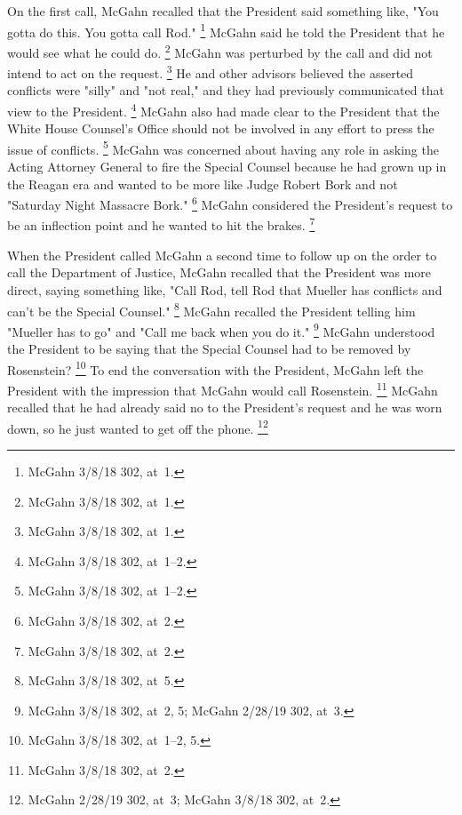 {On the first call, McGahn recalled that the President said something like, "You gotta do this.
You gotta call Rod."%
\footnote{McGahn 3/8/18 302, at~1.}
McGahn said he told the President that he would see what he could do.%
\footnote{McGahn 3/8/18 302, at~1.}
McGahn was perturbed by the call and did not intend to act on the request.%
\footnote{McGahn 3/8/18 302, at~1.}
He and other advisors believed the asserted conflicts were "silly" and "not real," and they had previously communicated that view to the President.%
\footnote{McGahn 3/8/18 302, at~1--2.}
McGahn also had made clear to the President that the White House Counsel's Office should not be involved in any effort to press the issue of conflicts.%
\footnote{McGahn 3/8/18 302, at~1--2.}
McGahn was concerned about having any role in asking the Acting Attorney General to fire the Special Counsel because he had grown up in the Reagan era and wanted to be more like Judge Robert Bork and not "Saturday Night Massacre Bork."%
\footnote{McGahn 3/8/18 302, at~2.}
McGahn considered the President's request to be an inflection point and he wanted to hit the brakes.%
\footnote{McGahn 3/8/18 302, at~2.}

When the President called McGahn a second time to follow up on the order to call the Department of Justice, McGahn recalled that the President was more direct, saying something like, "Call Rod, tell Rod that Mueller has conflicts and can't be the Special Counsel."%
\footnote{McGahn 3/8/18 302, at~5.}
McGahn recalled the President telling him "Mueller has to go" and "Call me back when you do it."%
\footnote{McGahn 3/8/18 302, at~2, 5;
McGahn 2/28/19 302, at~3.}
McGahn understood the President to be saying that the Special Counsel had to be removed by Rosenstein?%
\footnote{McGahn 3/8/18 302, at~1--2, 5.}
To end the conversation with the President, McGahn left the President with the impression that McGahn would call Rosenstein.%
\footnote{McGahn 3/8/18 302, at~2.}
McGahn recalled that he had already said no to the President's request and he was worn down, so he just wanted to get off the phone.%
\footnote{McGahn 2/28/19 302, at~3;
McGahn 3/8/18 302, at~2.}

}
